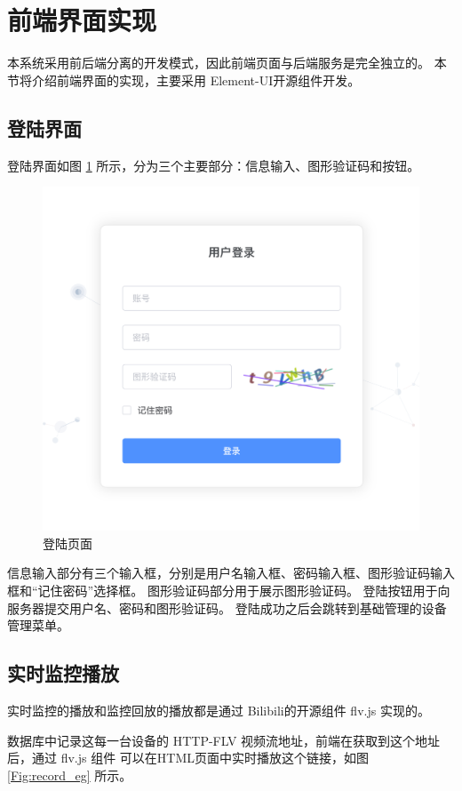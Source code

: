 \section{前端界面实现}
本系统采用前后端分离的开发模式，因此前端页面与后端服务是完全独立的。
本节将介绍前端界面的实现，主要采用 Element-UI开源组件开发。

\subsection{登陆界面}

登陆界面如图 \ref{Fig:login} 所示，分为三个主要部分：信息输入、图形验证码和按钮。

\begin{figure}[ht]
    \centering
    \includegraphics[width=0.8\linewidth]{./Figure/IMG_login.png}
    \caption{登陆页面}\label{Fig:login}
\end{figure}

信息输入部分有三个输入框，分别是用户名输入框、密码输入框、图形验证码输入框和“记住密码”选择框。
图形验证码部分用于展示图形验证码。
登陆按钮用于向服务器提交用户名、密码和图形验证码。
登陆成功之后会跳转到基础管理的设备管理菜单。

\subsection{实时监控播放}
实时监控的播放和监控回放的播放都是通过 Bilibili的开源组件 flv.js 实现的。

数据库中记录这每一台设备的 HTTP-FLV 视频流地址，前端在获取到这个地址后，通过 flv.js 组件
可以在HTML页面中实时播放这个链接，如图 \ref{Fig:record_eg} 所示。

